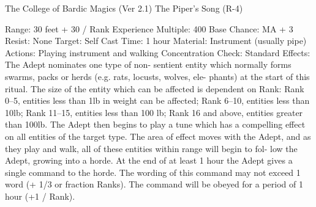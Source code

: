 \begin{Chapter}{The College of Bardic Magics (Ver 2.1)}
The Piper’s Song (R-4) 

Range: 30 feet + 30 / Rank 
Experience Multiple: 400 
Base Chance: MA + 3%
Resist: None 
Target: Self 
Cast Time: 1 hour 
Material: Instrument (usually pipe) 
Actions: Playing instrument and walking 
Concentration Check: Standard 
Effects:  The  Adept  nominates  one  type  of  non-
sentient  entity  which  normally  forms  swarms, 
packs  or  herds  (e.g.  rats,  locusts,  wolves,  ele-
phants)  at  the  start  of  this  ritual.  The  size  of  the 
entity which can be affected is dependent on Rank: 
Rank  0–5,  entities  less  than  1lb  in  weight  can  be 
affected;  Rank  6–10,  entities  less  than  10lb;  Rank 
11–15,  entities  less  than  100  lb;  Rank  16  and 
above,  entities  greater  than 100lb.  The  Adept  then 
begins to play a tune which has a compelling effect 
on all entities of the target type. The area of effect 
moves  with the Adept, and as they play and walk, 
all  of  these  entities  within  range  will  begin  to  fol-
low the Adept, growing into a horde. At the end of 
at  least  1  hour  the  Adept  gives  a  single  command 
to  the  horde.  The  wording  of  this  command  may 
not  exceed  1  word  (+  1/3  or  fraction  Ranks).  The 
command will be obeyed for a period of 1 hour (+1 
/ Rank). 

\end{Chapter}
